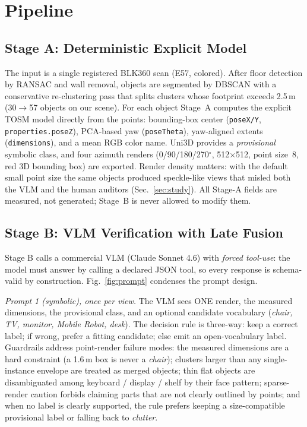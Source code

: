 \documentclass[conference]{IEEEtran}
\begin{document}
\section{Pipeline}

\subsection{Stage A: Deterministic Explicit Model}
The input is a single registered BLK360 scan (E57, colored). After floor
detection by RANSAC and wall removal, objects are segmented by DBSCAN with a
conservative re-clustering pass that splits clusters whose footprint exceeds
2.5\,m (30$\rightarrow$57 objects on our scene). For each object Stage~A
computes the explicit TOSM model directly from the points: bounding-box
center (\texttt{poseX/Y}, \texttt{properties.poseZ}), PCA-based yaw
(\texttt{poseTheta}), yaw-aligned extents (\texttt{dimensions}), and a mean
RGB color name. Uni3D provides a \emph{provisional} symbolic class, and four
azimuth renders (0/90/180/270$^{\circ}$, 512$\times$512, point size~8, red
3D bounding box) are exported. Render density matters: with the default
small point size the same objects produced speckle-like views that misled
both the VLM and the human auditors (Sec.~\ref{sec:study}). All Stage-A
fields are measured, not generated; Stage~B is never allowed to modify
them.

\subsection{Stage B: VLM Verification with Late Fusion}
\label{sec:stageb}
Stage B calls a commercial VLM (Claude Sonnet 4.6) with \emph{forced
tool-use}: the model must answer by calling a declared JSON tool, so every
response is schema-valid by construction. Fig.~\ref{fig:prompt} condenses
the prompt design.

\emph{Prompt 1 (symbolic), once per view.} The VLM sees ONE render, the
measured dimensions, the provisional class, and an optional candidate
vocabulary (\emph{chair, TV, monitor, Mobile Robot, desk}). The decision
rule is three-way: keep a correct label; if wrong, prefer a fitting
candidate; else emit an open-vocabulary label. Guardrails address
point-render failure modes: the measured dimensions are a hard constraint
(a 1.6\,m box is never a \emph{chair}); clusters larger than any
single-instance envelope are treated as merged objects; thin flat objects
are disambiguated among keyboard / display / shelf by their face pattern;
sparse-render caution forbids claiming parts that are not clearly outlined
by points; and when no label is clearly supported, the rule prefers keeping
a size-compatible provisional label or falling back to \emph{clutter}.
\end{document}
